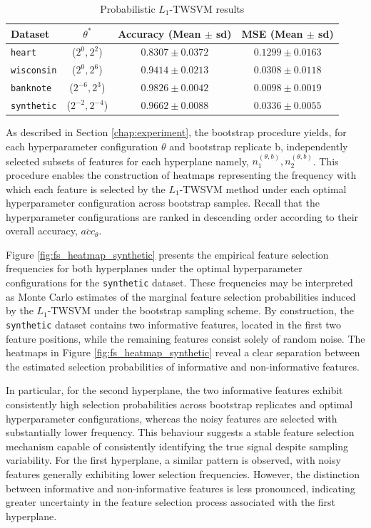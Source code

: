 \documentclass[12pt]{report} %
\begin{document}
\begin{table}[H]
\centering
\caption{Probabilistic $L_1$-TWSVM results}
\label{tab:results}
\begin{tabular}{lccc}
\hline
\textbf{Dataset} & \textbf{$\theta^{*}$} & \textbf{Accuracy (Mean $\pm$ sd)} & \textbf{MSE (Mean $\pm$ sd)} \\
\hline
\texttt{heart} & ($2^{0}, 2^{2}$) & $0.8307 \pm 0.0372$ & $0.1299 \pm 0.0163$ \\
\texttt{wisconsin} & ($2^{0}, 2^{6}$) & $0.9414 \pm 0.0213$ & $0.0308 \pm 0.0118$\\
\texttt{banknote} & ($2^{-6}, 2^{3}$) & $0.9826 \pm 0.0042$ & $0.0098 \pm 0.0019$ \\
\texttt{synthetic} & ($2^{-2}, 2^{-4}$) & $0.9662 \pm 0.0088$ & $0.0336 \pm 0.0055$ \\
\hline
\end{tabular}
\end{table}

As described in Section \ref{chap:experiment}, the bootstrap procedure yields, for each hyperparameter configuration $\theta$ and bootstrap replicate b, independently selected subsets of features for each hyperplane namely, $n_1^{(\theta, b)}, n_2^{(\theta, b)}$. This procedure enables the construction of heatmaps representing the frequency with which each feature is selected by the $L_1$-TWSVM method under each optimal hyperparameter configuration across bootstrap samples. Recall that the hyperparameter configurations are ranked in descending order according to their overall accuracy, $\bar{acc}_{\theta}$. 

\newpage

Figure \ref{fig:fs_heatmap_synthetic} presents the empirical feature selection frequencies for both hyperplanes under the optimal hyperparameter configurations for the \texttt{synthetic} dataset. These frequencies may be interpreted as Monte Carlo estimates of the marginal feature selection probabilities induced by the $L_1$-TWSVM under the bootstrap sampling scheme. By construction, the \texttt{synthetic} dataset contains two informative features, located in the first two feature positions, while the remaining features consist solely of random noise. The heatmaps in Figure \ref{fig:fs_heatmap_synthetic} reveal a clear separation between the estimated selection probabilities of informative and non-informative features.

In particular, for the second hyperplane, the two informative features exhibit consistently high selection probabilities across bootstrap replicates and optimal hyperparameter configurations, whereas the noisy features are selected with substantially lower frequency. This behaviour suggests a stable feature selection mechanism capable of consistently identifying the true signal despite sampling variability. For the first hyperplane, a similar pattern is observed, with noisy features generally exhibiting lower selection frequencies. However, the distinction between informative and non-informative features is less pronounced, indicating greater uncertainty in the feature selection process associated with the first hyperplane.
\end{document}
